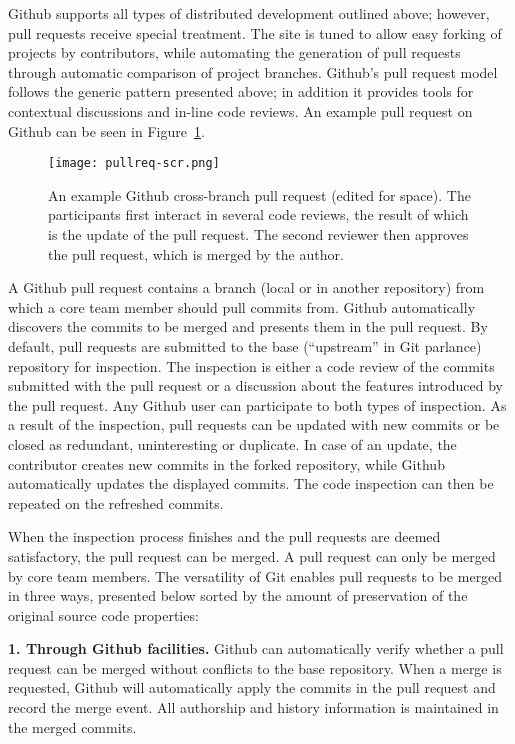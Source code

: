 \documentclass{sig-alternate}
\begin{document}
Github supports all types of distributed development outlined above; however,
pull requests receive special treatment. The site is tuned to allow easy forking
of projects by contributors, while automating the generation of pull requests
through automatic comparison of project branches.
Github's pull request model follows the generic pattern presented above; in
addition it provides tools for contextual discussions and in-line code reviews.
An example pull request on Github can be seen in Figure~\ref{fig:pullreq-scr}.

\begin{figure}[t]
  \centering
   \texttt{[image: pullreq-scr.png]}
   \caption{An example Github cross-branch pull request (edited for space). The
   participants first interact in several code reviews, the result of which is
   the update of the pull request. The second reviewer then approves the pull
   request, which is merged by the author.}
   \label{fig:pullreq-scr}
\end{figure}

A Github pull request contains a branch (local or in another repository) from
which a core team member should pull commits from. Github automatically
discovers the commits to be merged and presents them in the pull request. By
default, pull requests are submitted to the base (``upstream'' in Git parlance)
repository for inspection. The
inspection is either a code review of the commits submitted with the pull
request or a discussion about the features introduced by the pull request. Any
Github user can participate to both types of inspection. As a result of the
inspection, pull requests can be updated with new commits or be closed as
redundant, uninteresting or duplicate. In case of an update, the contributor
creates new commits in the forked repository, while Github automatically
updates the displayed commits. The code inspection can then be repeated on the
refreshed commits.

When the inspection process finishes and the pull requests are deemed
satisfactory, the pull request can be merged. A pull request can only be merged
by core team members. The versatility of Git enables pull requests to be
merged in three ways, presented below sorted by the amount of preservation of
the original source code properties:

\textbf{1. Through Github facilities.}
    Github can automatically verify whether a
    pull request can be merged without conflicts to the base repository. When a
    merge is requested, Github will automatically apply the commits in the pull
    request and record the merge event. All authorship and history information
    is maintained in the merged commits.
\end{document}
